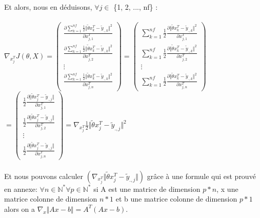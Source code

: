 \documentclass[a4paper,10pt]{article}
\begin{document}
\noindent Et alors, nous en d\'{e}duisons, $\forall j \in$ \{1, 2, ..., nf\} :\\\\
$\nabla_{x_{j}^T} J(\theta, X)=
\begin{pmatrix}
\displaystyle\frac{\partial \displaystyle\sum_{k=1}^{nf}\frac{1}{2}\Vert\tilde{\theta}x_{k}^{T}-\tilde{y}_{.,k}\Vert^{2}}{\partial x_{j,1}^{T}}\\
\displaystyle\frac{\partial \displaystyle\sum_{k=1}^{nf}\frac{1}{2}\Vert\tilde{\theta}x_{k}^{T}-\tilde{y}_{.,k}\Vert^{2}}{\partial x_{j,2}^{T}}\\
\vdots\\
\displaystyle\frac{\partial \displaystyle\sum_{k=1}^{nf}\frac{1}{2}\Vert\tilde{\theta}x_{k}^{T}-\tilde{y}_{.,k}\Vert^{2}}{\partial x_{j,n}^{T}}
\end{pmatrix}
=
\begin{pmatrix}
\displaystyle\sum_{k=1}^{nf}
\frac{1}{2}\frac{\partial\Vert\tilde{\theta}x_{k}^{T}-\tilde{y}_{.,k}\Vert^{2}}{\partial x_{j,1}^{T}}\\
\displaystyle\sum_{k=1}^{nf}
\frac{1}{2}\frac{\partial\Vert\tilde{\theta}x_{k}^{T}-\tilde{y}_{.,k}\Vert^{2}}{\partial x_{j,2}^{T}}\\
\vdots\\
\displaystyle\sum_{k=1}^{nf}
\frac{1}{2}\frac{\partial\Vert\tilde{\theta}x_{k}^{T}-\tilde{y}_{.,k}\Vert^{2}}{\partial x_{j,n}^{T}}
\end{pmatrix}$\\
$
=
\begin{pmatrix}
\displaystyle
\frac{1}{2}\frac{\partial\Vert\tilde{\theta}x_{j}^{T}-\tilde{y}_{.,j}\Vert}{\partial x_{j,1}^{T}}\\
\displaystyle
\frac{1}{2}\frac{\partial\Vert\tilde{\theta}x_{j}^{T}-\tilde{y}_{.,j}\Vert}{\partial x_{j,2}^{T}}\\
\vdots\\
\displaystyle
\frac{1}{2}\frac{\partial\Vert\tilde{\theta}x_{j}^{T}-\tilde{y}_{.,j}\Vert}{\partial x_{j,n}^{T}}
\end{pmatrix}
=
\displaystyle
\nabla_{x_{j}^T}\frac{1}{2}\Vert\tilde{\theta}x_{j}^{T}-\tilde{y}_{.,j}\Vert^{2}
$\\\\
Et nous pouvons calculer $(\nabla_{x_{j}^{T}}\Vert\tilde{\theta}x_{j}^{T}-\tilde{y}_{.,j}\Vert)$ gr\^{a}ce \`{a} une formule qui est prouvé en annexe: $\forall n \in \mathbb{N}^{*} \forall p \in \mathbb{N}^{*}$ si A est une matrice de dimension $p*n$, x une matrice colonne de dimension $n*1$ et b une matrice colonne de dimension $p*1$ alors on a $\nabla_{x}\Vert Ax-b \Vert = A^{T}(Ax-b)$.\\\\
\end{document}
